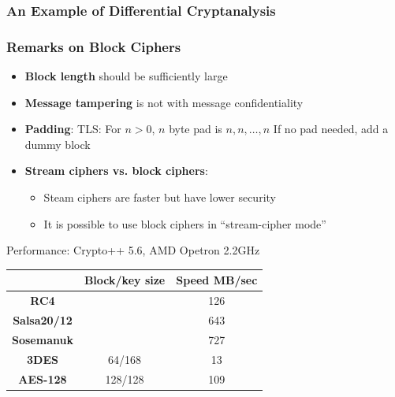 \begin{frame}\frametitle{An Example of Differential Cryptanalysis}
\begin{figure}
\begin{center}

\end{center}
\end{figure}
\end{frame}
\begin{frame}\frametitle{Remarks on Block Ciphers}
\begin{itemize}
\item \textbf{Block length} should be sufficiently large
\item \textbf{Message tampering} is not with message confidentiality
\item \textbf{Padding}: TLS: For $n>0$, $n$ byte pad is $n,n,\dots,n$
If no pad needed, add a dummy block
\item \textbf{Stream ciphers vs. block ciphers}: 
\begin{itemize}
\item Steam ciphers are faster but have lower security
\item It is possible to use block ciphers in ``stream-cipher mode''
\end{itemize}
\end{itemize}
\begin{exampleblock}{Performance: Crypto++ 5.6, AMD Opetron 2.2GHz}
\begin{center}
\begin{tabular}{|c|c|c|} \hline
                      & \textbf{Block/key size} & \textbf{Speed MB/sec} \\ \hline
\textbf{RC4}          &         & 126 \\  
\textbf{Salsa20/12}   &         & 643 \\ 
\textbf{Sosemanuk}    &         & 727 \\ 
\textbf{3DES}	      & 64/168  & 13  \\
\textbf{AES-128}      & 128/128 & 109 \\ \hline 
\end{tabular}	
\end{center}
\end{exampleblock}
\end{frame}
